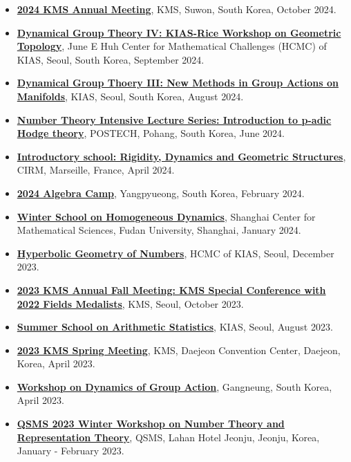 \documentclass[9pt]{developercv} %
\begin{document}
\begin{itemize}
\item \href{https://www.kms.or.kr/conference/2024_fall/}{\textbf{2024 KMS Annual Meeting}}, KMS, Suwon, South Korea, October 2024.
\item {\href{https://sites.google.com/view/dgt4-kias}{\textbf{Dynamical Group Theory IV: KIAS-Rice Workshop on Geometric Topology}}}, June E Huh Center for Mathematical Challenges (HCMC) of KIAS, Seoul, South Korea, September 2024.
\item \href{https://dgt3.kimsh.kr/}{\textbf{Dynamical Group Thoery III: New Methods in Group Actions on Manifolds}}, KIAS, Seoul, South Korea, August 2024.
\item \href{https://math.postech.ac.kr/bbs/board.php?bo_table=m07_01&year=2024&month=6&wr_id=82&sc_no=}{\textbf{Number Theory Intensive Lecture Series: Introduction to p-adic Hodge theory}}, POSTECH, Pohang, South Korea, June 2024.
\item \href{https://conferences.cirm-math.fr/2968.html}{\textbf{Introductory school: Rigidity, Dynamics and Geometric
Structures}}, CIRM, Marseille, France, April 2024.
\item \href{https://sites.google.com/snu.ac.kr/algebra-camp2024/}{\textbf{2024 Algebra Camp}}, Yangpyueong, South Korea, February 2024.
\item \href{https://scms.fudan.edu.cn/info/4588/6088_1.htm}{\textbf{Winter School on Homogeneous Dynamics}}, Shanghai Center for Mathematical Sciences, Fudan University,
Shanghai, January 2024.
\item \href{https://sites.google.com/viSNU Graduateew/hygen2023}{\textbf{Hyperbolic Geometry of Numbers}}, HCMC of KIAS, Seoul, December 2023.
\item \href{https://www.kms.or.kr/conference/2023_fall/}{\textbf{2023 KMS Annual Fall Meeting: KMS Special Conference with 2022 Fields Medalists}}, KMS, Seoul, October 2023.
\item \href{http://events.kias.re.kr/h/SSAS23/?pageNo=5106}{\textbf{Summer School on Arithmetic Statistics}}, KIAS, Seoul, August 2023.
\item \href{https://www.kms.or.kr/conference/2023_spring/index.html?period=84}{\textbf{2023 KMS Spring Meeting}}, KMS, Daejeon Convention Center, Daejeon, Korea, April 2023.
\item \href{https://sites.google.com/view/2023gangneung}{\textbf{Workshop on Dynamics of Group Action}}, Gangneung, South Korea, April 2023.
\item \href{https://sites.google.com/snu.ac.kr/qsms2023}{\textbf{QSMS 2023 Winter Workshop on Number Theory and Representation Theory}}, QSMS, Lahan Hotel Jeonju, Jeonju, Korea, January - February 2023.
\end{itemize}
\end{document}
